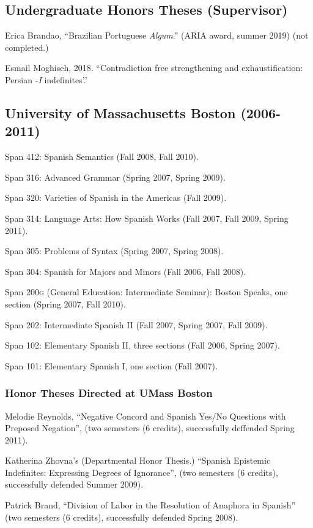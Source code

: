\documentclass[11pt]{article}
\begin{document}
\subsection*{Undergraduate Honors Theses (Supervisor)}

Erica Brandao, ``Brazilian Portuguese \textit{Algum}.'' (ARIA award, summer 2019) (not completed.)

Esmail Moghiseh, 2018. ``Contradiction free strengthening and exhaustification: Persian -\textit{I} indefinites'.' 

\subsection*{University of Massachusetts Boston (2006-2011)}


Span 412: Spanish Semantics (Fall 2008, Fall 2010).

Span 316: Advanced Grammar (Spring 2007, Spring 2009).

Span 320: Varieties of Spanish in the Americas (Fall 2009).

Span 314: Language Arts: How Spanish Works (Fall 2007, Fall 2009,
Spring 2011).

Span 305: Problems of Syntax (Spring 2007, Spring 2008).

Span 304: Spanish for Majors and Minors (Fall 2006, Fall 2008).

Span 200\textsc{g} (General Education: Intermediate Seminar): Boston
Speaks, one section (Spring 2007, Fall 2010).

Span 202: Intermediate Spanish II  (Fall 2007, Spring 2007, Fall
2009).

Span 102: Elementary Spanish II,  three sections (Fall 2006, Spring
2007).

Span 101: Elementary Spanish I, one section (Fall 2007).	

 \subsubsection*{Honor Theses Directed at UMass Boston}

 Melodie Reynolds, ``Negative Concord and
Spanish Yes/No Questions with Preposed Negation'', (two semesters (6
credits), successfully deffended Spring 2011).

 Katherina Zhovna's (Departmental Honor
  Thesis.)  ``Spanish Epistemic Indefinites: Expressing
  Degrees of Ignorance'', (two semesters (6 credits), successfully defended Summer 2009).

 Patrick Brand, ``Division of
  Labor in the Resolution of Anaphora in Spanish''  (two semesters (6 credits), successfully
  defended Spring 2008).
\end{document}

